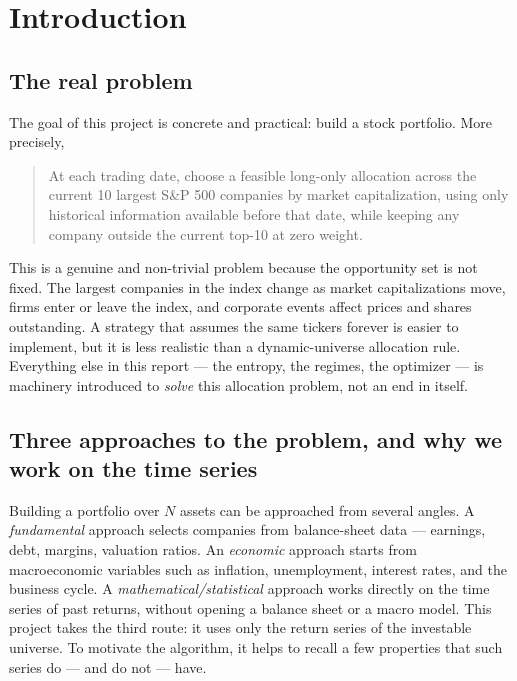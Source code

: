 \documentclass[a4paper,12pt]{article}
\begin{document}
\tableofcontents
\newpage

\section{Introduction}

\subsection{The real problem}

The goal of this project is concrete and practical: build a stock portfolio. More precisely,
\begin{quote}
At each trading date, choose a feasible long-only allocation across the current 10 largest S\&P 500 companies by market capitalization, using only historical information available before that date, while keeping any company outside the current top-10 at zero weight.
\end{quote}

This is a genuine and non-trivial problem because the opportunity set is not fixed. The largest companies in the index change as market capitalizations move, firms enter or leave the index, and corporate events affect prices and shares outstanding. A strategy that assumes the same tickers forever is easier to implement, but it is less realistic than a dynamic-universe allocation rule. Everything else in this report --- the entropy, the regimes, the optimizer --- is machinery introduced to \emph{solve} this allocation problem, not an end in itself.

\subsection{Three approaches to the problem, and why we work on the time series}

Building a portfolio over \(N\) assets can be approached from several angles. A \emph{fundamental} approach selects companies from balance-sheet data --- earnings, debt, margins, valuation ratios. An \emph{economic} approach starts from macroeconomic variables such as inflation, unemployment, interest rates, and the business cycle. A \emph{mathematical/statistical} approach works directly on the time series of past returns, without opening a balance sheet or a macro model. This project takes the third route: it uses only the return series of the investable universe. To motivate the algorithm, it helps to recall a few properties that such series do --- and do not --- have.
\end{document}
